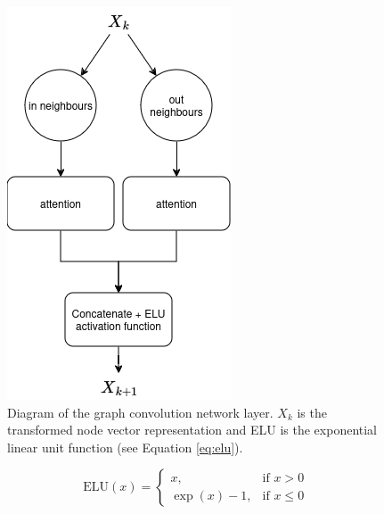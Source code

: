 \begin{figure}
    \centering
    \includegraphics[width=0.5\linewidth]{images/gcn_update_aggregate_diagram.png}
    \caption{Diagram of the graph convolution network layer. $X_k$ is the transformed node vector representation
    and ELU is the exponential linear unit function (see Equation \ref{eq:elu}).}
    \label{fig:update_aggregate_diagram}
\end{figure}

\begin{equation}
\text{ELU}(x) = 
\begin{cases}
x, & \text{if } x > 0 \\
\exp(x) - 1, & \text{if } x \leq 0
\end{cases}
\label{eq:elu}
\end{equation}


